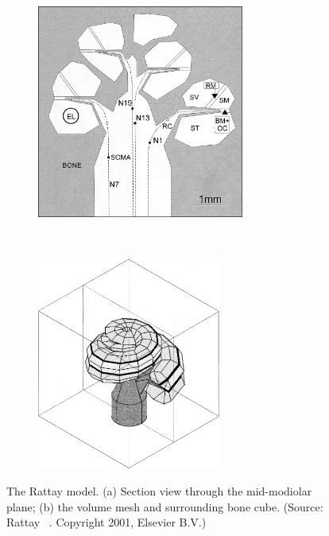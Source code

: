 \begin{figure}
	\centering
	
	\begin{subfigure}[t]{0.46\textwidth}
        \centering
        \includegraphics[height=7cm]{Background/rattay_midplane}
        \caption{}
        \label{fig:rattay_section}
    \end{subfigure}%
    ~~~~~
    \begin{subfigure}[t]{0.42\textwidth}
        \centering
        \includegraphics[height=7cm]{Background/rattay_mesh}
        \caption{}
        \label{fig:rattay_mesh}
    \end{subfigure}%
	
	\caption[The Rattay model]{The Rattay model. (a) Section view through the
	mid-modiolar plane; (b) the volume mesh and surrounding bone cube. (Source:
	Rattay \etal~\cite{rattay2001model}. Copyright \textcopyright{} 2001, Elsevier
	B.V.)}
	\label{fig:model_rattay}
\end{figure}

